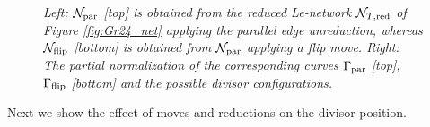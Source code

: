 \documentclass[11pt]{amsart}
\theoremstyle{plain}
\numberwithin{equation}{section}
\begin{document}
\begin{figure}
\caption{\small{\sl Left: ${\mathcal N}_{\mbox{\scriptsize par}}$ [top] is obtained from the reduced Le-network ${\mathcal N}_{T,{\mbox{\scriptsize red}}}$ of Figure \ref{fig:Gr24_net} applying the parallel edge unreduction, whereas ${\mathcal N}_{\mbox{\scriptsize flip}}$ [bottom] is obtained from ${\mathcal N}_{\mbox{\scriptsize par}}$ applying a flip move.
Right: The partial normalization of the corresponding curves ${\Gamma}_{\mbox{\scriptsize par}}$ [top], ${\Gamma}_{\mbox{\scriptsize flip}}$ [bottom] and the possible divisor configurations.
}}
\label{fig:Gr24_moves}
\end{figure}

Next we show the effect of moves and reductions on the divisor position. 
\end{document}
